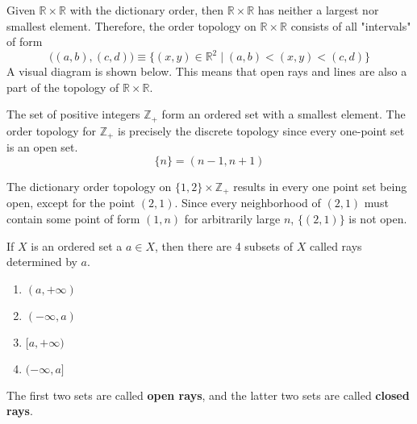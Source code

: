   \begin{example}
    Given $\mathbb{R} \times \mathbb{R}$ with the dictionary order, then $\mathbb{R} \times \mathbb{R}$ has neither a largest nor smallest element. Therefore, the order topology on $\mathbb{R} \times \mathbb{R}$ consists of all "intervals" of form
    \[\big((a, b), (c, d) \big) \equiv  \{(x, y) \in \mathbb{R}^2 \; | \; (a, b) < (x, y) < (c, d)\}\]
    A visual diagram is shown below. This means that open rays and lines are also a part of the topology of $\mathbb{R} \times \mathbb{R}$. 

    \begin{center}
    \end{center}
  \end{example}

  \begin{example}
    The set of positive integers $\mathbb{Z}_+$ form an ordered set with a smallest element. The order topology for $\mathbb{Z}_+$ is precisely the discrete topology since every one-point set is an open set. 
    \begin{equation}
      \{n\} = (n-1, n+1)
    \end{equation}
  \end{example}

  \begin{example}
    The dictionary order topology on $\{1, 2\} \times \mathbb{Z}_+$ results in every one point set being open, except for the point $(2, 1)$. Since every neighborhood of $(2,1)$ must contain some point of form $(1, n)$ for arbitrarily large $n$, $\{(2,1)\}$ is not open. 
  \end{example}

  \begin{definition}
    If $X$ is an ordered set a $a \in X$, then there are 4 subsets of $X$ called rays determined by $a$. 
    \begin{enumerate}
      \item $(a, +\infty)$ 
      \item $(-\infty, a)$
      \item $[a, +\infty)$
      \item $(-\infty, a]$
    \end{enumerate}
    The first two sets are called \textbf{open rays}, and the latter two sets are called \textbf{closed rays}. 
  \end{definition}

